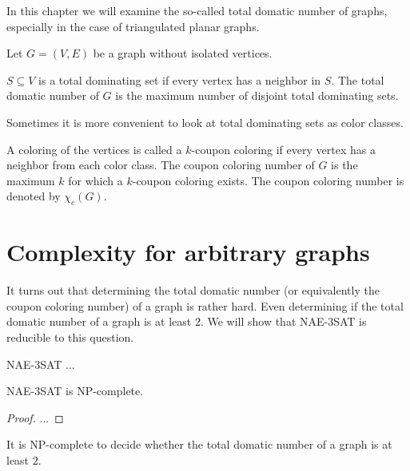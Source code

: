 In this chapter we will examine the so-called total domatic number of graphs,
especially in the case of triangulated planar graphs.

Let $G = (V, E)$ be a graph without isolated vertices.

\begin{definition}
  $S \subseteq V$ is a total dominating set if every vertex has a neighbor in
  $S$. The total domatic number of $G$ is the maximum number of disjoint total
  dominating sets.
\end{definition}

Sometimes it is more convenient to look at total dominating sets as color classes.

\begin{definition}
  A coloring of the vertices is called a $k$-coupon coloring if every vertex
  has a neighbor from each color class. The coupon coloring number of $G$ is
  the maximum $k$ for which a $k$-coupon coloring exists. The coupon coloring
  number is denoted by $\chi_c(G)$.
\end{definition}

\section{Complexity for arbitrary graphs}

It turns out that determining the total domatic number (or equivalently the
coupon coloring number) of a graph is rather hard. Even determining if the total
domatic number of a graph is at least $2$. We will show that NAE-3SAT is
reducible to this question.

\begin{definition}
  NAE-3SAT ...
\end{definition}

\begin{thm}
  NAE-3SAT is NP-complete.
\end{thm}

\begin{proof}
  ...
\end{proof}

\begin{thm}
  It is NP-complete to decide whether the total domatic number of
  a graph is at least $2$.
\end{thm}

